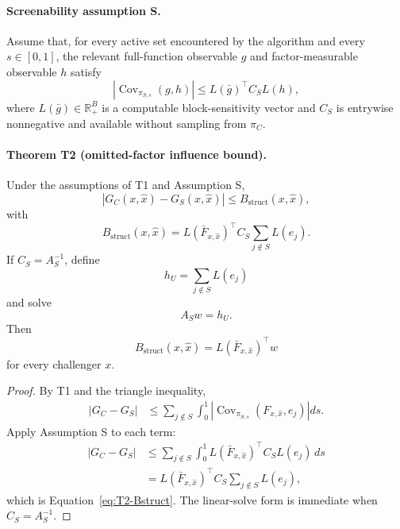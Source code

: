 \paragraph{Screenability assumption S.}
Assume that, for every active set encountered by the algorithm and every
$s\in[0,1]$, the relevant full-function observable $g$ and factor-measurable
observable $h$ satisfy
\begin{equation}
    |\operatorname{Cov}_{\pi_{S,s}}(g,h)|
    \le L(\bar g)^\top C_S L(h),
    \label{eq:S-cov}
\end{equation}
where $L(\bar g)\in\mathbb R_+^B$ is a computable block-sensitivity vector and
$C_S$ is entrywise nonnegative and available without sampling from $\pi_C$.

\paragraph{Theorem T2 (omitted-factor influence bound).}
Under the assumptions of T1 and Assumption S,
\begin{equation}
    |G_C(x,\widehat x)-G_S(x,\widehat x)|
    \le
    B_{\mathrm{struct}}(x,\widehat x),
    \label{eq:T2-bound}
\end{equation}
with
\begin{equation}
    B_{\mathrm{struct}}(x,\widehat x)
    =
    L(\bar F_{x,\widehat x})^\top C_S
    \sum_{j\notin S}L(e_j).
    \label{eq:T2-Bstruct}
\end{equation}
If $C_S=A_S^{-1}$, define
\[
    h_U=\sum_{j\notin S}L(e_j)
\]
and solve
\[
    A_S w=h_U.
\]
Then
\[
    B_{\mathrm{struct}}(x,\widehat x)
    =L(\bar F_{x,\widehat x})^\top w
\]
for every challenger $x$.

\begin{proof}
By T1 and the triangle inequality,
\begin{align*}
    |G_C-G_S|
    &\le
    \sum_{j\notin S}\int_0^1
    \left|
    \operatorname{Cov}_{\pi_{S,s}}
    (F_{x,\widehat x},e_j)
    \right|ds.
\end{align*}
Apply Assumption S to each term:
\begin{align*}
    |G_C-G_S|
    &\le
    \sum_{j\notin S}\int_0^1
    L(\bar F_{x,\widehat x})^\top C_S L(e_j)\,ds\\
    &=
    L(\bar F_{x,\widehat x})^\top C_S
    \sum_{j\notin S}L(e_j),
\end{align*}
which is Equation~\eqref{eq:T2-Bstruct}.  The linear-solve form is immediate
when $C_S=A_S^{-1}$.
\end{proof}

